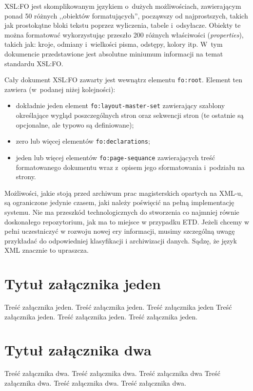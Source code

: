 \documentclass[skorowidz,brudnopis,xodstep]{xmgr}
\begin{document}
XSL:FO jest skomplikowanym językiem o~dużych możliwościach,
zawierającym ponad 50 różnych ,,obiektów formatujących'', począwszy od
najprostszych, takich jak prostokątne bloki tekstu poprzez wyliczenia,
tabele i~odsyłacze. Obiekty te można formatować wykorzystując przeszło
200 różnych właściwości (\emph{properties\/}), takich jak: kroje,
odmiany i~wielkości pisma, odstępy, kolory itp.  
W~tym dokumencie przedstawione jest absolutne miniumum informacji 
na temat standardu XSL:FO.

Cały dokument XSL:FO zawarty jest wewnątrz elementu \texttt{fo:root}.
Element ten zawiera (w~podanej niżej kolejności):
\begin{itemize}
\item dokładnie jeden element \texttt{fo:layout-master-set} zawierający
  szablony określające wygląd poszczególnych stron oraz sekwencji
  stron (te ostatnie są opcjonalne, ale typowo są definiowane);
\item zero lub więcej elementów \texttt{fo:declarations};
\item jeden lub więcej elementów \texttt{fo:page-sequance}
 zawierających treść formatowanego dokumentu wraz z~opisem
 jego sformatowania i~podziału na strony.
\end{itemize}

%
\summary
Możliwości, jakie stoją przed archiwum prac magisterskich opartych na
XML-u, są ograniczone jedynie czasem, jaki należy poświęcić na pełną
implementację systemu. Nie ma przeszkód technologicznych do stworzenia
co najmniej równie doskonałego repozytorium, jak ma to miejsce w
przypadku ETD. Jeżeli chcemy w pełni uczestniczyć w rozwoju nowej ery
informacji, musimy szczególną uwagę przykładać do odpowiedniej
klasyfikacji i archiwizacji danych. Sądzę, że język XML znacznie to
upraszcza.

%
\appendix
\chapter{Tytuł załącznika jeden}

Treść załącznika jeden. Treść załącznika jeden. Treść załącznika jeden
Treść załącznika jeden. Treść załącznika jeden.
Treść załącznika jeden.

\chapter{Tytuł załącznika dwa}

Treść załącznika dwa. Treść załącznika dwa. Treść załącznika dwa
Treść załącznika dwa. Treść załącznika dwa.
Treść załącznika dwa.
\end{document}
